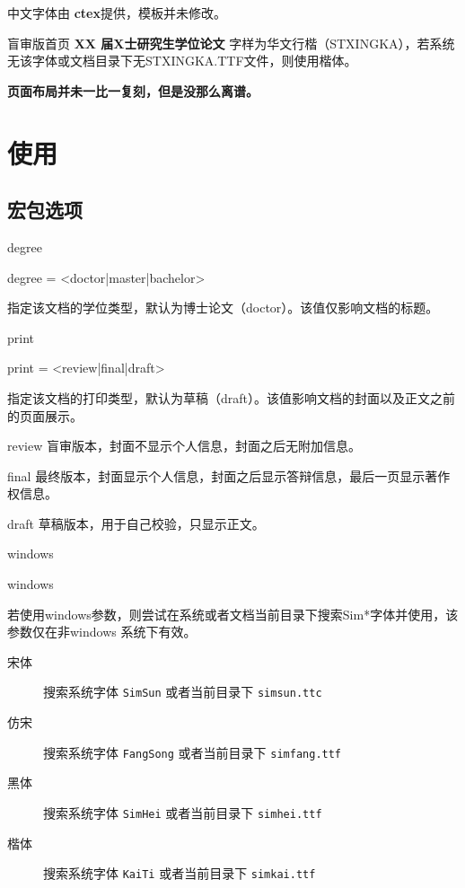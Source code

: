 \documentclass{ctxdoc}
\begin{document}
    中文字体由 \textbf{ctex}提供，模板并未修改。

    盲审版首页 \textbf{XX 届X士研究生学位论文} 字样为华文行楷（STXINGKA），若系统无该字体或文档目录下无STXINGKA.TTF文件，则使用楷体。


    \textbf{页面布局并未一比一复刻，但是没那么离谱。}


    \section{使用}
    \subsection{宏包选项}
    \begin{function}[added=2024-08-18]{degree}
        \begin{syntax}
            degree = <doctor|master|bachelor>
        \end{syntax}
        指定该文档的学位类型，默认为博士论文（doctor）。该值仅影响文档的标题。
    \end{function}
    \begin{function}[added=2024-08-18]{print}
        \begin{syntax}
            print = <review|final|draft>
        \end{syntax}
        指定该文档的打印类型，默认为草稿（draft）。该值影响文档的封面以及正文之前的页面展示。
    \end{function}

    \begin{optdesc}
        \item[review] 盲审版本，封面不显示个人信息，封面之后无附加信息。
        \item[final] 最终版本，封面显示个人信息，封面之后显示答辩信息，最后一页显示著作权信息。
        \item[draft] 草稿版本，用于自己校验，只显示正文。
    \end{optdesc}
    
    
        \begin{function}[added=2024-08-19]{windows}
        \begin{syntax}
            windows
        \end{syntax}
        若使用windows参数，则尝试在系统或者文档当前目录下搜索Sim*字体并使用，该参数仅在非windows 系统下有效。
        \begin{description}
            \item[宋体] 搜索系统字体 \texttt{SimSun} 或者当前目录下 \texttt{simsun.ttc}
            \item[仿宋] 搜索系统字体 \texttt{FangSong} 或者当前目录下 \texttt{simfang.ttf}
            \item[黑体] 搜索系统字体 \texttt{SimHei} 或者当前目录下 \texttt{simhei.ttf}
            \item[楷体] 搜索系统字体 \texttt{KaiTi} 或者当前目录下 \texttt{simkai.ttf}
         \end{description}
    \end{function}
    
\end{document}
